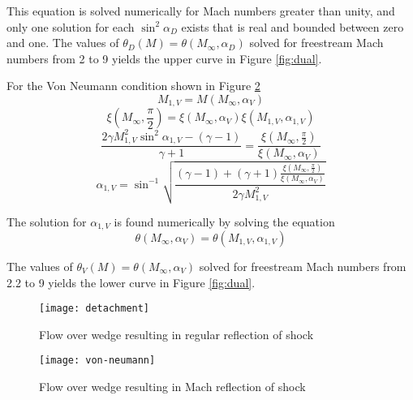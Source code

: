 This equation is solved numerically for Mach numbers greater than unity, and only one solution for each $\sin^{2}{\alpha_D}$ exists that is real and bounded between zero and one. The values of $\theta_D(M) = \theta\left(M_{\infty},\alpha_D\right)$ solved for freestream Mach numbers from 2 to 9 yields the upper curve in Figure \ref{fig:dual}.

For the Von Neumann condition shown in Figure \ref{fig:von-neumann}
\begin{equation}
    M_{1,V} = M(M_{\infty},\alpha_V)
\end{equation}
\begin{equation}
    \xi\left(M_{\infty},\frac{\pi}{2}\right) = \xi\left(M_{\infty},\alpha_V\right) \xi\left(M_{1,V},\alpha_{1,V}\right)
\end{equation}
\begin{equation}
    \frac{2 \gamma M_{1,V}^2 \sin^2{\alpha_{1,V}} - (\gamma-1)}{\gamma+1} = \frac{\xi\left(M_{\infty},\frac{\pi}{2}\right)}{\xi\left(M_{\infty},\alpha_V\right)}
\end{equation}
\begin{equation}
    \alpha_{1,V} = \sin^{-1}{\sqrt{\frac{(\gamma-1)+(\gamma+1)\frac{\xi\left(M_{\infty},\frac{\pi}{2}\right)}{\xi\left(M_{\infty},\alpha_V\right)}}{2 \gamma M_{1,V}^2}}}
\end{equation}

The solution for $\alpha_{1,V}$ is found numerically by solving the equation
\begin{equation}
    \theta\left(M_{\infty},\alpha_V\right) = \theta\left(M_{1,V},\alpha_{1,V}\right) 
\end{equation}

The values of $\theta_V(M) = \theta\left(M_{\infty},\alpha_V\right)$ solved for freestream Mach numbers from 2.2 to 9 yields the lower curve in Figure \ref{fig:dual}.

\begin{figure}[ht!]
    \centering
    \texttt{[image: detachment]}
    \caption[Flow over wedge resulting in regular reflection of shock]{Flow over wedge resulting in regular reflection of shock \cite{mouton}}
    \label{fig:detachment}
\end{figure}

\begin{figure}[ht!]
    \centering
    \texttt{[image: von-neumann]}
    \caption[Flow over wedge resulting in Mach reflection of shock]{Flow over wedge resulting in Mach reflection of shock \cite{mouton}}
    \label{fig:von-neumann}
\end{figure}

